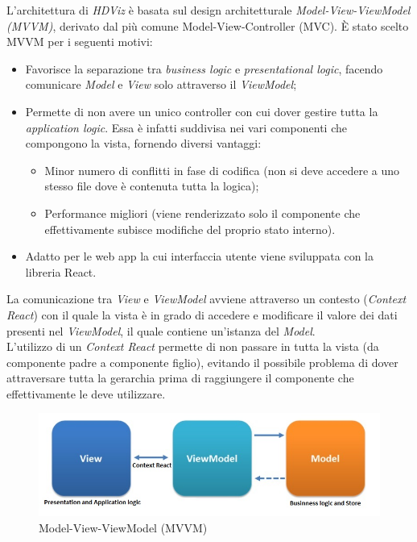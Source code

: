L'architettura di \textit{HDViz} è basata sul design architetturale \textit{Model-View-ViewModel (MVVM)}, derivato dal più comune Model-View-Controller (MVC). 
È stato scelto MVVM per i seguenti motivi: 
\begin{itemize}
	\item Favorisce la separazione tra \textit{business logic} e \textit{presentational logic}, facendo comunicare \textit{Model} e \textit{View} solo attraverso il \textit{ViewModel};  
	\item Permette di non avere un unico controller con cui dover gestire tutta la \textit{application logic}. Essa è infatti suddivisa nei vari componenti che compongono la vista, fornendo diversi vantaggi: 
	\begin{itemize}
		\item Minor numero di conflitti in fase di codifica (non si deve accedere a uno stesso file dove è contenuta tutta la logica);
		\item Performance migliori (viene renderizzato solo il componente che effettivamente subisce modifiche del proprio stato interno).
	\end{itemize}
	\item Adatto per le web app la cui interfaccia utente viene sviluppata con la libreria React.
\end{itemize}

La comunicazione tra \textit{View} e \textit{ViewModel} avviene attraverso un contesto (\textit{Context React}) con il quale la vista è in grado di accedere e modificare il valore dei dati presenti nel \textit{ViewModel}, il quale contiene un'istanza del \textit{Model}. \\
L'utilizzo di un \textit{Context React} permette di non passare  in tutta la vista (da componente padre a componente figlio), evitando il possibile problema di dover attraversare tutta la gerarchia prima di raggiungere il componente che effettivamente le deve utilizzare.

\begin{figure}[hb]
\includegraphics[width=15.8cm]{Extra/MVVMPattern}
\centering
\caption{Model-View-ViewModel (MVVM)}
\end{figure}